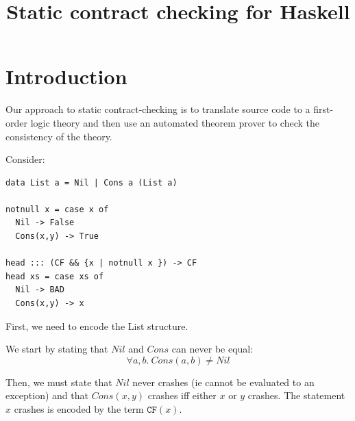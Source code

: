 \documentclass[preprint]{sigplanconf}
\begin{document}
\def\ruleform#1{{\setlength{\fboxrule}{1.2pt}\fbox{\normalsize $#1$}}}
\newcommand{\etrans}[1]{\mathcal{E} \llbracket #1 \rrbracket}
\newcommand{\dtrans}[1]{\mathcal{D} \llbracket #1 \rrbracket}
\newcommand{\ktrans}[1]{\mathcal{K} \llbracket #1 \rrbracket}
\newcommand{\ctrans}[1]{\mathcal{C} \llbracket #1 \rrbracket}
\newcommand{\trans}[1]{\llbracket #1 \rrbracket}

\newcommand{\tot}{\leftrightarrow}

\newtheorem{definition}{Definition}

\newcommand{\unr}{\texttt{UNR}}
\newcommand{\bad}{\texttt{BAD}}
\newcommand{\any}{\texttt{Any}}
\newcommand{\ok}{\texttt{Ok}}
\newcommand{\hprime}{\mathcal{H}'}
\newcommand{\cfc}{\texttt{CF}}
\newcommand{\cf}[1]{\texttt{CF}(#1)}
\newcommand{\weak}[1]{\mbox{$\$$weak}(#1)}
\renewcommand{\min}[1]{\mbox{min}(#1)}


\title{Static contract checking for Haskell}
\maketitle

\section{Introduction}

Our approach to static contract-checking is to translate source code
to a first-order logic theory and
 then use an automated theorem prover
to check the consistency of the theory.

Consider:
\begin{verbatim}
data List a = Nil | Cons a (List a)

notnull x = case x of
  Nil -> False
  Cons(x,y) -> True

head ::: (CF && {x | notnull x }) -> CF
head xs = case xs of
  Nil -> BAD
  Cons(x,y) -> x
\end{verbatim}

First, we need to encode the List structure. 

We start by stating that $Nil$ and $Cons$ can never be equal:
\begin{equation*}
\forall a,b.~Cons(a,b) \neq Nil
\end{equation*}

Then, we must state that $Nil$ never crashes (ie cannot be evaluated
to an exception) and that $Cons(x,y)$ crashes iff either $x$ or $y$
crashes. The statement $x$ crashes is encoded by the term $\cf{x}$.
\end{document}

